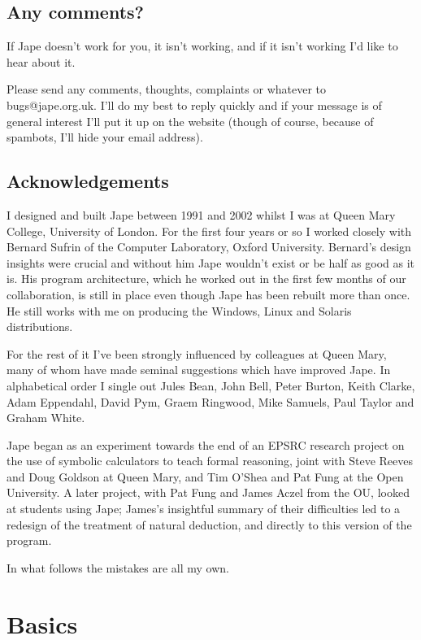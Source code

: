 \documentclass[11pt]{book}
\begin{document}
\section*{Any comments?}

If Jape doesn't work for you, it isn't working, and if it isn't working I'd like to hear about it. 

Please send any comments, thoughts, complaints or whatever to bugs@jape.org.uk. I'll do my best to reply quickly and if your message is of general interest I'll put it up on the website (though of course, because of spambots, I'll hide your email address). 

\section*{Acknowledgements}

I designed and built Jape between 1991 and 2002 whilst I was at Queen Mary College, University of London. For the first four years or so I worked closely with Bernard Sufrin of the Computer Laboratory, Oxford University. Bernard's design insights were crucial and without him Jape wouldn't exist or be half as good as it is. His program architecture, which he worked out in the first few months of our collaboration, is still in place even though Jape has been rebuilt more than once. He still works with me on producing the Windows, Linux and Solaris distributions.

For the rest of it I've been strongly influenced by colleagues at Queen Mary, many of whom have made seminal suggestions which have improved Jape. In alphabetical order I single out Jules Bean, John Bell, Peter Burton, Keith Clarke, Adam Eppendahl, David Pym, Graem Ringwood, Mike Samuels, Paul Taylor and Graham White. 

Jape began as an experiment towards the end of an EPSRC research project on the use of symbolic calculators to teach formal reasoning, joint with Steve Reeves and Doug Goldson at Queen Mary, and Tim O'Shea and Pat Fung at the Open University. A later project, with Pat Fung and James Aczel from the OU, looked at students using Jape; James's insightful summary of their difficulties led to a redesign of the treatment of natural deduction, and directly to this version of the program.

In what follows the mistakes are all my own.

\chapter{Basics}
\end{document}

